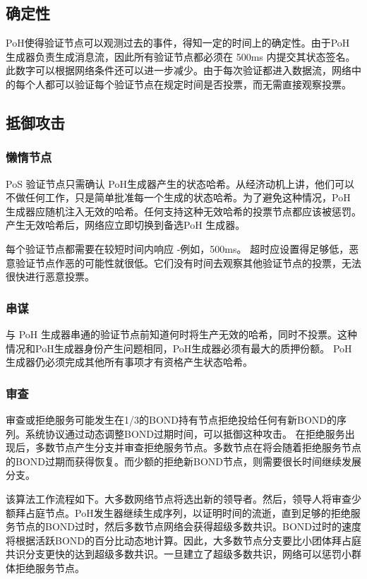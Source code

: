 \documentclass[12pt, uft8]{ctexart}
\begin{document}
\subsection{确定性}\label{availability}
PoH使得验证节点可以观测过去的事件，得知一定的时间上的确定性。由于PoH 生成器负责生成消息流，因此所有验证节点都必须在 500ms 内提交其状态签名。此数字可以根据网络条件还可以进一步减少。由于每次验证都进入数据流，网络中的每个人都可以验证每个验证节点在规定时间是否投票，而无需直接观察投票。

\subsection{抵御攻击}
\subsubsection{懒惰节点}
PoS 验证节点只需确认 PoH生成器产生的状态哈希。从经济动机上讲，他们可以不做任何工作，只是简单批准每一个生成的状态哈希。为了避免这种情况，PoH 生成器应随机注入无效的哈希。任何支持这种无效哈希的投票节点都应该被惩罚。产生无效哈希后，网络应立即切换到备选PoH 生成器。

每个验证节点都需要在较短时间内响应 -例如，500ms。 超时应设置得足够低，恶意验证节点作恶的可能性就很低。它们没有时间去观察其他验证节点的投票，无法很快进行恶意投票。

\subsubsection{串谋}\label{subsubsec:collusion}
与 PoH 生成器串通的验证节点前知道何时将生产无效的哈希，同时不投票。这种情况和PoH生成器身份产生问题相同，PoH生成器必须有最大的质押份额。 PoH生成器仍必须完成其他所有事项才有资格产生状态哈希。

\subsubsection{审查}\label{censorship}
审查或拒绝服务可能发生在1/3的BOND持有节点拒绝投给任何有新BOND的序列。系统协议通过动态调整BOND过期时间，可以抵御这种攻击。 在拒绝服务出现后，多数节点产生分支并审查拒绝服务节点。多数节点在将会随着拒绝服务节点的BOND过期而获得恢复。而少额的拒绝新BOND节点，则需要很长时间继续发展分支。

该算法工作流程如下。大多数网络节点将选出新的领导者。然后，领导人将审查少额拜占庭节点。PoH发生器继续生成序列，以证明时间的流逝，直到足够的拒绝服务节点的BOND过时，然后多数节点网络会获得超级多数共识。BOND过时的速度将根据活跃BOND的百分比动态地计算。因此，大多数节点分支要比小团体拜占庭共识分支更快的达到超级多数共识。一旦建立了超级多数共识，网络可以惩罚小群体拒绝服务节点。
\end{document}
